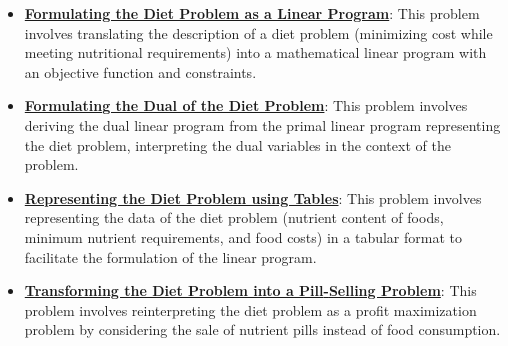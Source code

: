 \documentclass{article}%
\begin{document}
\begin{itemize}[leftmargin=*]%
\item \href{https://www.math.purdue.edu/~yipn/421//2024-09-19-DualityExamples.pdf#page=5}{\textbf{Formulating the Diet Problem as a Linear Program}}: This problem involves translating the description of a diet problem (minimizing cost while meeting nutritional requirements) into a mathematical linear program with an objective function and constraints.%
\item \href{https://www.math.purdue.edu/~yipn/421//2024-09-19-DualityExamples.pdf#page=8}{\textbf{Formulating the Dual of the Diet Problem}}: This problem involves deriving the dual linear program from the primal linear program representing the diet problem, interpreting the dual variables in the context of the problem.%
\item \href{https://www.math.purdue.edu/~yipn/421//2024-09-19-DualityExamples.pdf#page=3}{\textbf{Representing the Diet Problem using Tables}}: This problem involves representing the data of the diet problem (nutrient content of foods, minimum nutrient requirements, and food costs) in a tabular format to facilitate the formulation of the linear program.%
\item \href{https://www.math.purdue.edu/~yipn/421//2024-09-19-DualityExamples.pdf#page=7}{\textbf{Transforming the Diet Problem into a Pill{-}Selling Problem}}: This problem involves reinterpreting the diet problem as a profit maximization problem by considering the sale of nutrient pills instead of food consumption.%
\end{itemize}%
\end{document}

